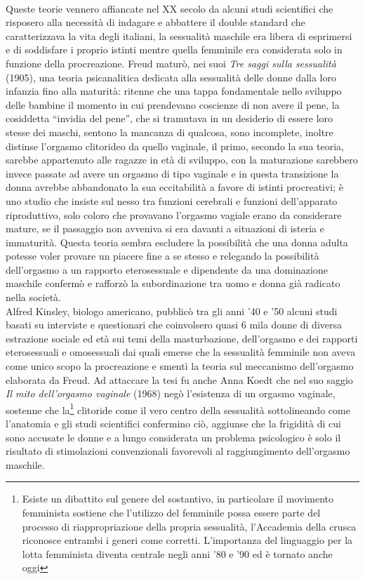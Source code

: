 \\Queste teorie vennero affiancate nel XX secolo da alcuni studi scientifici che risposero alla necessità di indagare e abbattere il double standard che caratterizzava la vita degli italiani, la sessualità maschile era libera di esprimersi e di soddisfare i proprio istinti mentre quella femminile era considerata solo in funzione della procreazione.
Freud maturò, nei suoi \textit{Tre saggi sulla sessualità} (1905), una teoria psicanalitica dedicata alla sessualità delle donne dalla loro infanzia fino alla maturità: ritenne che una tappa fondamentale nello sviluppo delle bambine il momento in cui prendevano coscienze di non avere il pene, la cosiddetta \enquote{invidia del pene}, che si tramutava in un desiderio di essere loro stesse dei maschi, sentono la mancanza di qualcosa, sono incomplete, inoltre distinse l'orgasmo clitorideo da quello vaginale, il primo, secondo la sua teoria, sarebbe appartenuto alle ragazze in età di sviluppo, con la maturazione sarebbero invece passate ad avere un orgasmo di tipo vaginale e in questa transizione la donna avrebbe abbandonato la sua eccitabilità a favore di istinti procreativi; è uno studio che insiste sul nesso tra funzioni cerebrali e funzioni dell'apparato riproduttivo, solo coloro che provavano l'orgasmo vagiale erano da considerare mature, se il passaggio non avveniva si era davanti a situazioni di isteria e immaturità.
Questa teoria sembra escludere la possibilità che una donna adulta potesse voler provare un piacere fine a se stesso e relegando la possibilità dell'orgasmo a un rapporto eterosessuale e dipendente da una dominazione maschile confermò e rafforzò la subordinazione tra uomo e donna già radicato nella società.
\\Alfred Kinsley, biologo americano, pubblicò tra gli anni '40 e '50 alcuni studi basati su interviste e questionari che coinvolsero quasi 6 mila donne di diversa estrazione sociale ed età sui temi della masturbazione, dell'orgasmo e dei rapporti eterosessuali e omosessuali dai quali emerse che  la sessualità femminile non aveva come unico scopo la procreazione e smentì la teoria sul meccanismo dell'orgasmo elaborata da Freud.
Ad attaccare la tesi fu anche Anna Koedt che nel suo saggio \textit{Il mito dell'orgasmo vaginale} (1968) negò l'esistenza di un orgasmo vaginale, sostenne che la\footnote{Esiste un dibattito sul genere del sostantivo, in particolare il movimento femminista sostiene che l'utilizzo del femminile possa essere parte del processo di riappropriazione della propria sessualità, l'Accademia della crusca riconosce entrambi i generi come corretti. L'importanza del linguaggio per la lotta femminista diventa centrale negli anni '80 e '90 ed è tornato anche oggi} clitoride come il vero centro della sessualità sottolineando come l'anatomia e gli studi scientifici confermino ciò, aggiunse che la frigidità di cui sono accusate le donne e a lungo considerata un problema psicologico è solo il risultato di stimolazioni convenzionali favorevoli al raggiungimento dell'orgasmo maschile.
